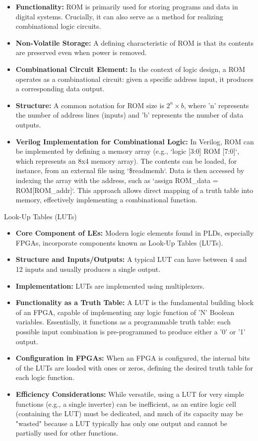 \documentclass{article}
\begin{document}
\begin{itemize}
    \item \textbf{Functionality:} ROM is primarily used for storing programs and data in digital systems. Crucially, it can also serve as a method for realizing combinational logic circuits.
    \item \textbf{Non-Volatile Storage:} A defining characteristic of ROM is that its contents are preserved even when power is removed.
    \item \textbf{Combinational Circuit Element:} In the context of logic design, a ROM operates as a combinational circuit: given a specific address input, it produces a corresponding data output.
    \item \textbf{Structure:} A common notation for ROM size is $2^n \times b$, where 'n' represents the number of address lines (inputs) and 'b' represents the number of data outputs.
    \item \textbf{Verilog Implementation for Combinational Logic:} In Verilog, ROM can be implemented by defining a memory array (e.g., `logic [3:0] ROM [7:0]`, which represents an 8x4 memory array). The contents can be loaded, for instance, from an external file using `\$readmemh`. Data is then accessed by indexing the array with the address, such as `assign ROM\_data = ROM[ROM\_addr]`. This approach allows direct mapping of a truth table into memory, effectively implementing a combinational function.
\end{itemize}

Look-Up Tables (LUTs)

\begin{itemize}
    \item \textbf{Core Component of LEs:} Modern logic elements found in PLDs, especially FPGAs, incorporate components known as Look-Up Tables (LUTs).
    \item \textbf{Structure and Inputs/Outputs:} A typical LUT can have between 4 and 12 inputs and usually produces a single output.
    \item \textbf{Implementation:} LUTs are implemented using multiplexers.
    \item \textbf{Functionality as a Truth Table:} A LUT is the fundamental building block of an FPGA, capable of implementing any logic function of 'N' Boolean variables. Essentially, it functions as a programmable truth table: each possible input combination is pre-programmed to produce either a '0' or '1' output.
    \item \textbf{Configuration in FPGAs:} When an FPGA is configured, the internal bits of the LUTs are loaded with ones or zeros, defining the desired truth table for each logic function.
    \item \textbf{Efficiency Considerations:} While versatile, using a LUT for very simple functions (e.g., a single inverter) can be inefficient, as an entire logic cell (containing the LUT) must be dedicated, and much of its capacity may be "wasted" because a LUT typically has only one output and cannot be partially used for other functions.
\end{itemize}
\end{document}
